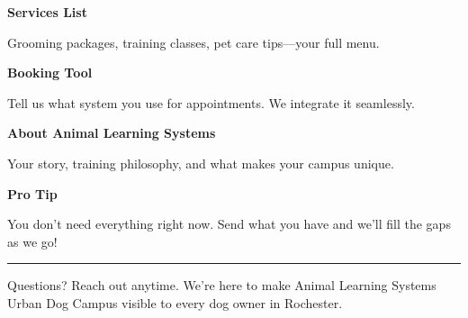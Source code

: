 \documentclass[11pt,letterpaper]{article}
\begin{document}
\hfill
\begin{minipage}[t]{0.48\textwidth}
\begin{tcolorbox}[colframe=accent-teal, boxrule=1pt, left=0.7em, right=0.7em, top=0.5em, bottom=0.5em, arc=4pt, boxsep=0pt]
{\bfseries\small\color{accent-teal}Services List}

\vspace{0.15em}

{\small Grooming packages, training classes, pet care tips—your full menu.}
\end{tcolorbox}

\vspace{0.1em}

\begin{tcolorbox}[colframe=accent-teal, boxrule=1pt, left=0.7em, right=0.7em, top=0.5em, bottom=0.5em, arc=4pt, boxsep=0pt]
{\bfseries\small\color{accent-teal}Booking Tool}

\vspace{0.15em}

{\small Tell us what system you use for appointments. We integrate it seamlessly.}
\end{tcolorbox}

\vspace{0.1em}

\begin{tcolorbox}[colframe=accent-teal, boxrule=1pt, left=0.7em, right=0.7em, top=0.5em, bottom=0.5em, arc=4pt, boxsep=0pt]
{\bfseries\small\color{accent-teal}About Animal Learning Systems}

\vspace{0.15em}

{\small Your story, training philosophy, and what makes your campus unique.}
\end{tcolorbox}

\vspace{-0.2em}
\end{minipage}

\vspace{0.15em}

\begin{tcolorbox}[colback={accent-red!5}, colframe=accent-red!20, boxrule=0.5pt, left=0.7em, right=0.7em, top=0.4em, bottom=0.4em, arc=6pt, boxsep=0pt]

{\bfseries\small\color{accent-red}Pro Tip}

\vspace{0.1em}

{\small You don't need everything right now. Send what you have and we'll fill the gaps as we go!}

\end{tcolorbox}

\vspace{0.15em}

\noindent\hrule
\vspace{0.2em}

{\small\color{text-light}Questions? Reach out anytime. We're here to make Animal Learning Systems Urban Dog Campus visible to every dog owner in Rochester.}
\end{document}
